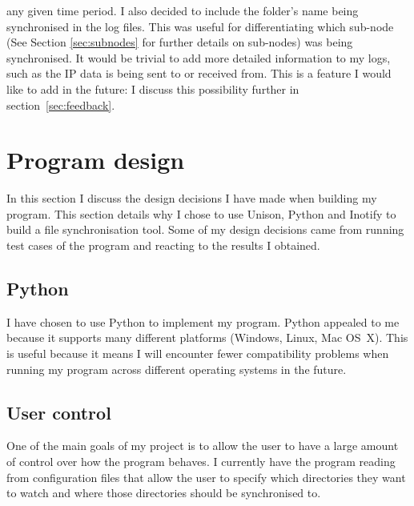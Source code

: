 \documentclass[12pt]{article}
\begin{document}
any given time period. I also decided to include
the folder's name being synchronised in the log files.
This was useful for differentiating which sub-node
(See Section \ref{sec:subnodes} for
further details on sub-nodes)
was being synchronised.
It would be trivial to add more detailed information to my logs,
such as the IP data is being sent to or received from.
This is a feature I would like to add in the future: I discuss this
possibility further in section~\ref{sec:feedback}.

\newpage
\section{Program design}
In this section I discuss the design decisions I have
made when building my program. This section details
why I chose to use Unison, Python and Inotify to
build a file synchronisation tool. Some of my design
decisions came from running test cases of the program
and reacting to the results I obtained.

\subsection{Python}
I have chosen to use Python to implement
my program. Python appealed to me because it
supports many different platforms (Windows, Linux, Mac OS~X).
This is useful because it means I will
encounter fewer compatibility problems when running
my program across different operating systems in the future.


\subsection{User control}
One of the main goals of my project is to allow the user
to have a  large amount of control over how the program
behaves. I currently have the program reading from
configuration files that allow the user to specify
which directories they want to watch and where those
directories should be synchronised to.
\end{document}
